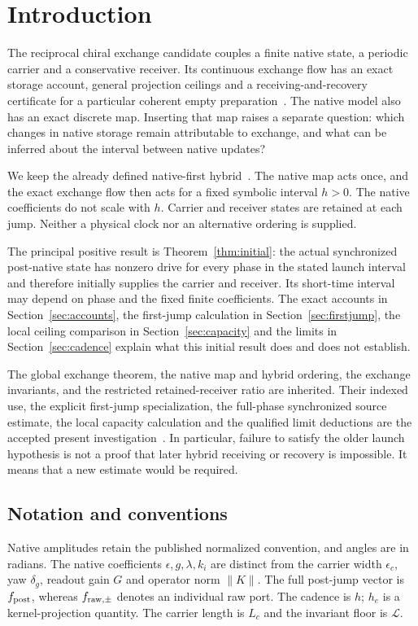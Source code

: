 \section{Introduction}\label{sec:introduction}
The reciprocal chiral exchange candidate couples a finite native state, a periodic carrier and a conservative receiver. Its continuous exchange flow has an exact storage account, general projection ceilings and a receiving-and-recovery certificate for a particular coherent empty preparation~\cite{rx,pc,rr}. The native model also has an exact discrete map. Inserting that map raises a separate question: which changes in native storage remain attributable to exchange, and what can be inferred about the interval between native updates?

We keep the already defined native-first hybrid~\cite[Section 6]{rx}. The native map acts once, and the exact exchange flow then acts for a fixed symbolic interval $h>0$. The native coefficients do not scale with $h$. Carrier and receiver states are retained at each jump. Neither a physical clock nor an alternative ordering is supplied.

The principal positive result is Theorem~\ref{thm:initial}: the actual synchronized post-native state has nonzero drive for every phase in the stated launch interval and therefore initially supplies the carrier and receiver. Its short-time interval may depend on phase and the fixed finite coefficients. The exact accounts in Section~\ref{sec:accounts}, the first-jump calculation in Section~\ref{sec:firstjump}, the local ceiling comparison in Section~\ref{sec:capacity} and the limits in Section~\ref{sec:cadence} explain what this initial result does and does not establish.

The global exchange theorem, the native map and hybrid ordering, the exchange invariants, and the restricted retained-receiver ratio are inherited. Their indexed use, the explicit first-jump specialization, the full-phase synchronized source estimate, the local capacity calculation and the qualified limit deductions are the accepted present investigation~\cite{investigation,acceptance}. In particular, failure to satisfy the older launch hypothesis is not a proof that later hybrid receiving or recovery is impossible. It means that a new estimate would be required.

\subsection{Notation and conventions}\label{sec:notation}
Native amplitudes retain the published normalized convention, and angles are in radians. The native coefficients $\epsilon,g,\lambda,k_i$ are distinct from the carrier width $\epsilon_c$, yaw $\delta_g$, readout gain $G$ and operator norm $\|K\|$. The full post-jump vector is $f_{\rm post}$, whereas $f_{{\rm raw},\pm}$ denotes an individual raw port. The cadence is $h$; $h_e$ is a kernel-projection quantity. The carrier length is $L_c$ and the invariant floor is $\mathcal L$.

